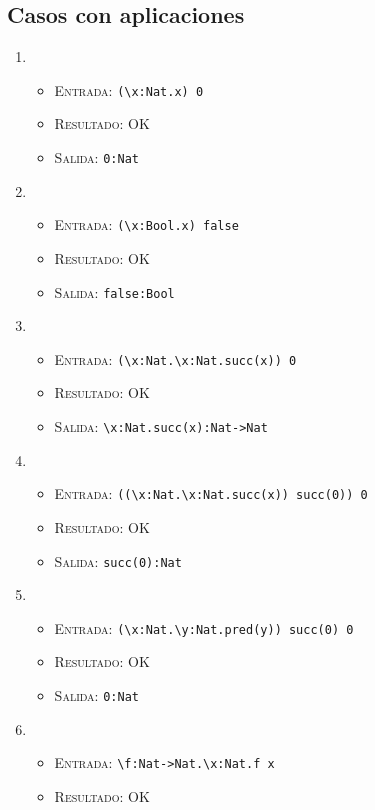 \documentclass[11pt]{article}
\newcounter{savedenum}
\newcommand{\loadenum}{\setcounter{enumi}{\thesavedenum}}
\begin{document}
\subsection{Casos con aplicaciones}
\begin{enumerate}
\loadenum
\item \begin{itemize}
    \item \textsc{Entrada:}   \verb|(\x:Nat.x) 0|
    \item \textsc{Resultado:} OK
    \item \textsc{Salida:}    \verb|0:Nat|
    \end{itemize}
\item \begin{itemize}
    \item \textsc{Entrada:}   \verb|(\x:Bool.x) false|
    \item \textsc{Resultado:} OK
    \item \textsc{Salida:}    \verb|false:Bool|
    \end{itemize}
\item \begin{itemize}
    \item \textsc{Entrada:}   \verb|(\x:Nat.\x:Nat.succ(x)) 0|
    \item \textsc{Resultado:} OK
    \item \textsc{Salida:}    \verb|\x:Nat.succ(x):Nat->Nat|
    \end{itemize}
\item \begin{itemize}
    \item \textsc{Entrada:}   \verb|((\x:Nat.\x:Nat.succ(x)) succ(0)) 0|
    \item \textsc{Resultado:} OK
    \item \textsc{Salida:}    \verb|succ(0):Nat|
    \end{itemize}
\item \begin{itemize}
    \item \textsc{Entrada:}   \verb|(\x:Nat.\y:Nat.pred(y)) succ(0) 0|
    \item \textsc{Resultado:} OK
    \item \textsc{Salida:}    \verb|0:Nat|
    \end{itemize}
\item \begin{itemize}
    \item \textsc{Entrada:}   \verb|\f:Nat->Nat.\x:Nat.f x|
    \item \textsc{Resultado:} OK

\end{itemize}
\end{enumerate}
\end{document}
